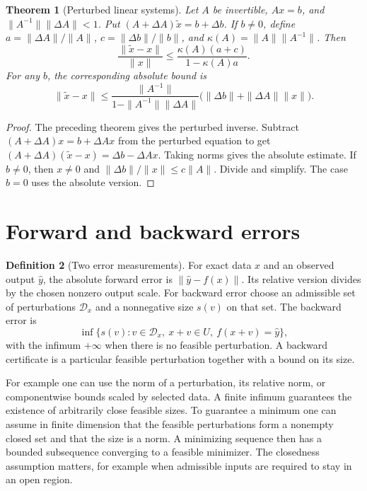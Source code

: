 \documentclass[11pt,oneside,openany]{book}
\theoremstyle{plain}
\newtheorem{theorem}{Theorem}[chapter]
\theoremstyle{definition}
\newtheorem{definition}[theorem]{Definition}
\theoremstyle{remark}
\begin{document}
\begin{theorem}[Perturbed linear systems]\label{p206:W11}
Let \(A\) be invertible, \(Ax=b\), and
\(\|A^{-1}\|\|\Delta A\|<1\). Put
\((A+\Delta A)\tilde x=b+\Delta b\).
If \(b\ne0\), define
\(a=\|\Delta A\|/\|A\|\), \(c=\|\Delta b\|/\|b\|\),
and \(\kappa(A)=\|A\|\|A^{-1}\|\). Then
\[
 \frac{\|\tilde x-x\|}{\|x\|}
 \le \frac{\kappa(A)(a+c)}{1-\kappa(A)a}.
\]
For any \(b\), the corresponding absolute bound is
\[
 \|\tilde x-x\|
 \le \frac{\|A^{-1}\|}{1-\|A^{-1}\|\|\Delta A\|}
       \bigl(\|\Delta b\|+\|\Delta A\|\|x\|\bigr).
\]
\end{theorem}
\begin{proof}
The preceding theorem gives the perturbed inverse. Subtract
\((A+\Delta A)x=b+\Delta A x\) from the perturbed equation to get
\((A+\Delta A)(\tilde x-x)=\Delta b-\Delta A x\).
Taking norms gives the absolute estimate.
If \(b\ne0\), then \(x\ne0\) and
\(\|\Delta b\|/\|x\|\le c\|A\|\). Divide and simplify.
The case \(b=0\) uses the absolute version.
\end{proof}

\section{Forward and backward errors}

\begin{definition}[Two error measurements]\label{p206:W12}
For exact data \(x\) and an observed output \(\hat y\), the
absolute forward error is \(\|\hat y-f(x)\|\). Its relative
version divides by the chosen nonzero output scale.
For backward error choose an admissible set of perturbations
\(\mathcal D_x\) and a nonnegative size \(s(v)\) on that set.
The backward error is
\[
 \inf\{s(v):v\in\mathcal D_x,\ x+v\in U,\ f(x+v)=\hat y\},
\]
with the infimum \(+\infty\) when there is no feasible
perturbation. A backward certificate is a particular feasible
perturbation together with a bound on its size.
\end{definition}
For example one can use the norm of a perturbation, its
relative norm, or componentwise bounds scaled by selected data.
A finite infimum guarantees the existence of arbitrarily close
feasible sizes. To guarantee a minimum one can assume in finite
dimension that the feasible perturbations form a nonempty closed set
and that the size is a norm. A minimizing sequence then has a
bounded subsequence converging to a feasible minimizer.
The closedness assumption matters, for example when admissible
inputs are required to stay in an open region.
\end{document}
